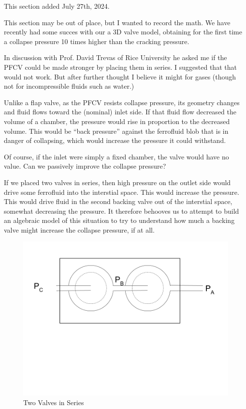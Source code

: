 \documentclass{asme2ej}
\begin{document}
This section added July 27th, 2024.

This section may be out of place, but I wanted to record the math.
We have recently had some succes with our a 3D valve model, obtaining
for the first time a collapse pressure 10 times higher than the cracking
pressure.

In discussion with Prof. David Trevas of Rice University he asked me
if the PFCV could be made stronger by placing them in series.
I suggested that that would not work. But after further thought I
believe it might for gases (though not for incompressible fluids such as water.)

Unlike a flap valve, as the PFCV resists collapse pressure, its
geometry changes and fluid flows toward the (nominal) inlet side.
If that fluid flow decreased the volume of a chamber, the pressure
would rise in proportion to the decreased volume. This would be
``back pressure'' against the ferrofluid blob that is in danger
of collapsing, which would increase the pressure it could withstand.

Of course, if the inlet were simply a fixed chamber, the valve
would have no value. Can we passively improve the collapse pressure?

If we placed two valves in series, then high pressure on the outlet
side would drive some ferrofluid into the interstial space.
This would increase the pressure. This would drive fluid in the second
backing valve out
of the interstial space, somewhat decreasing the pressure.
It therefore behooves us to attempt to build an algebraic model of this
situation to try to understand how much a backing valve might
increase the collapse pressure, if at all.


\begin{figure}
\centerline{\includegraphics[width=6in]{figure/TwoValvesInSeries.png}}
\caption{Two Valves in Series}
\label{fig:Series}
\end{figure}
\end{document}
